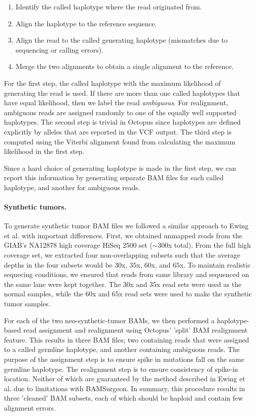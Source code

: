 \documentclass[notitlepage, twocolumn, 10pt]{article}
\begin{document}
\begin{enumerate}
	\item Identify the called haplotype where the read originated from.
	\item Align the haplotype to the reference sequence.
	\item Align the read to the called generating haplotype (mismatches due to sequencing or calling errors).
	\item Merge the two alignments to obtain a single alignment to the reference.
\end{enumerate}

For the first step, the called haplotype with the maximum likelihood of generating the read is used. If there are more than one called haplotypes that have equal likelihood, then we label the read \emph{ambiguous}. For realignment, ambiguous reads are assigned randomly to one of the equally well supported haplotypes. The second step is trivial in Octopus since haplotypes are defined explicitly by alleles that are reported in the VCF output. The third step is computed using the Viterbi alignment found from calculating the maximum likelihood in the first step.

Since a hard choice of generating haplotype is made in the first step, we can report this information by generating separate BAM files for each called haplotype, and another for ambiguous reads.

\paragraph*{Synthetic tumors.} To generate synthetic tumor BAM files we followed a similar approach to Ewing et al. \cite{RN147} with important differences. First, we obtained unmapped reads from the GIAB's NA12878 high coverage HiSeq 2500 set ($\sim 300$x total). From the full high coverage set, we extracted four non-overlapping subsets such that the average depths in the four subsets would be $30$x, $35$x, $60$x, and $65$x. To maintain realistic sequecing conditions, we ensured that reads from same library and sequenced on the same lane were kept together. The $30$x and $35$x read sets were used as the normal samples, while the $60$x and $65$x read sets were used to make the synthetic tumor samples.

For each of the two neo-synthetic-tumor BAMs, we then performed a haplotype-based read assignment and realignment using Octopus' 'split' BAM realignment feature. This results in three BAM files; two containing reads that were assigned to a called germline haplotype, and another containing ambiguous reads. The purpose of the assignment step is to ensure spike in mutations fall on the same germline haplotype. The realignment step is to ensure consistency of spike-in location. Neither of which are guaranteed by the method described in Ewing et al. due to limitations with BAMSurgeon. In summary, this procedure results in three 'cleaned' BAM subsets, each of which should be haploid and contain few alignment errors.
\end{document}
